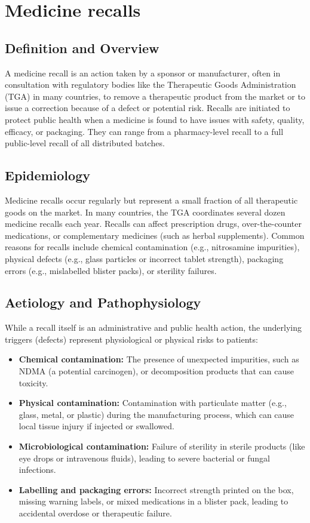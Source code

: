 \chapter{Medicine recalls}

\section*{Definition and Overview}
A medicine recall is an action taken by a sponsor or manufacturer, often in consultation with regulatory bodies like the Therapeutic Goods Administration (TGA) in many countries, to remove a therapeutic product from the market or to issue a correction because of a defect or potential risk. Recalls are initiated to protect public health when a medicine is found to have issues with safety, quality, efficacy, or packaging. They can range from a pharmacy-level recall to a full public-level recall of all distributed batches.

\section*{Epidemiology}
Medicine recalls occur regularly but represent a small fraction of all therapeutic goods on the market. In many countries, the TGA coordinates several dozen medicine recalls each year. Recalls can affect prescription drugs, over-the-counter medications, or complementary medicines (such as herbal supplements). Common reasons for recalls include chemical contamination (e.g., nitrosamine impurities), physical defects (e.g., glass particles or incorrect tablet strength), packaging errors (e.g., mislabelled blister packs), or sterility failures.

\section*{Aetiology and Pathophysiology}
While a recall itself is an administrative and public health action, the underlying triggers (defects) represent physiological or physical risks to patients:

\begin{itemize}
    \item \textbf{Chemical contamination:} The presence of unexpected impurities, such as NDMA (a potential carcinogen), or decomposition products that can cause toxicity.
    \item \textbf{Physical contamination:} Contamination with particulate matter (e.g., glass, metal, or plastic) during the manufacturing process, which can cause local tissue injury if injected or swallowed.
    \item \textbf{Microbiological contamination:} Failure of sterility in sterile products (like eye drops or intravenous fluids), leading to severe bacterial or fungal infections.
    \item \textbf{Labelling and packaging errors:} Incorrect strength printed on the box, missing warning labels, or mixed medications in a blister pack, leading to accidental overdose or therapeutic failure.
\end{itemize}


